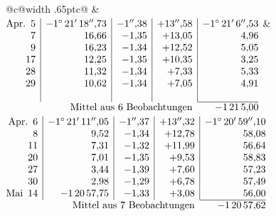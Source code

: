\noindent\begin{tabular}{@{}c@{\hspace{.4em}\vrule width .65pt\hspace{.4em}}c@{}}
 &
 \\[.18ex]
\(\begin{array}[t]{@{}r|r|r|r|r@{}}
\text{Apr.}\enspace 5 & -1^\circ\,21'\,18''{,}73 & -1''{,}38 & +13''{,}58 & -1^\circ\,21'\,6''{,}53\\
7 & 16{,}66 & -1{,}35 & +13{,}05 & 4{,}96\\
9 & 16{,}23 & -1{,}34 & +12{,}52 & 5{,}05\\
17 & 12{,}25 & -1{,}35 & +10{,}35 & 3{,}25\\
28 & 11{,}32 & -1{,}34 & +7{,}33 & 5{,}33\\
29 & 10{,}62 & -1{,}34 & +7{,}05 & 4{,}91\\
 & & & & \\
\cline{5-5}
\multicolumn{4}{r}{\text{Mittel aus 6 Beobachtungen}} & -1\,21\,5{,}00
\end{array}\)
&
\(\begin{array}[t]{@{}r|r|r|r|r@{}}
\text{Apr.}\enspace 6 & -1^\circ\,21'\,11''{,}05 & -1''{,}37 & +13''{,}32 & -1^\circ\,20'\,59''{,}10\\
8 & 9{,}52 & -1{,}34 & +12{,}78 & 58{,}08\\
11 & 7{,}31 & -1{,}32 & +11{,}99 & 56{,}64\\
20 & 7{,}01 & -1{,}35 & +9{,}53 & 58{,}83\\
27 & 3{,}44 & -1{,}39 & +7{,}60 & 57{,}23\\
30 & 2{,}98 & -1{,}29 & +6{,}78 & 57{,}49\\
\text{Mai}\enspace 14 & -1\,20\,57{,}75 & -1{,}33 & +3{,}08 & 56{,}00\\
\cline{5-5}
\multicolumn{4}{r}{\text{Mittel aus 7 Beobachtungen}} & -1\,20\,57{,}62
\end{array}\)
\end{tabular}\par\medskip
